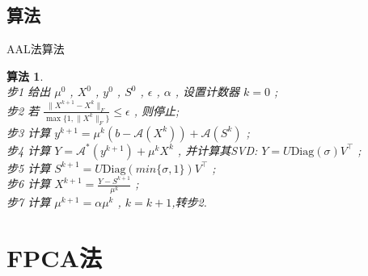 \documentclass[slidestop, compress, mathserif, UTF8]{beamer}
\newtheorem{algo}{\bf \textcolor[rgb]{0.8,0,0}{算法}}
\numberwithin{equation}{section}                                        %
\begin{document}
		\subsection{算法}
			\begin{frame}[t]{AAL法算法}
				\begin{algo}
					\quad\\
					步1 \quad 给出 $\mu^0$ , $X^0$ , $y^0$ , $S^0$ , $\epsilon$ , $\alpha$ , 设置计数器 $k=0$ ;\\
					步2 \quad 若 $\frac{\lVert{X^{k + 1} - X^k}\rVert_F}{\max \{1, \lVert{X^k}\rVert_F\}} \leq \epsilon$ , 则停止;\\
					步3 \quad 计算 $y^{k + 1} = \mu^k (b - \mathcal{A}(X^k)) + \mathcal{A}(S^k)$ ;\\
					步4 \quad 计算 $Y = \mathcal{A}^*(y^{k + 1}) + \mu^k X^k$ , 并计算其SVD: $Y = U \text{Diag}(\sigma) V^\top$ ;\\
					步5 \quad 计算 $S^{k + 1} = U \text{Diag}(min \{\sigma, 1\}) V^\top$ ;\\
					步6 \quad 计算 $X^{k + 1} = \frac{Y - S^{k + 1}}{\mu^k}$ ;\\
					步7 \quad 计算 $\mu^{k + 1} = \alpha \mu^k$ , $k = k + 1$,转步2.
				\end{algo}
			\end{frame}
	\section{FPCA法}\label{section4}
\end{document}
